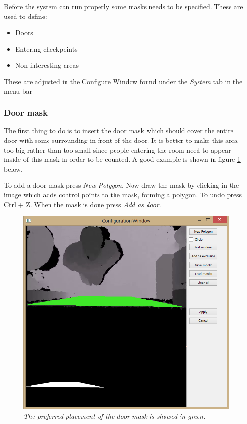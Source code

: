 Before the system can run properly some masks needs to be specified. These are used to define:

\begin{itemize}
\item Doors
\item Entering checkpoints
\item Non-interesting areas

\end{itemize}

These are adjusted in the Configure Window found under the \textit{System} tab in the menu bar.

\subsubsection{Door mask}
The first thing to do is to insert the door mask which should cover the entire door with some surrounding in front of the door. It is better to make this area too big rather than too small since people entering the room need to appear inside of this mask in order to be counted. A good example is shown in figure \ref{fig:doorMask} below. 

To add a door mask press \textit{New Polygon}. Now draw the mask by clicking in the image which adds control points to the mask, forming a polygon. To undo press Ctrl + Z. When the mask is done press \textit{Add as door}.

\begin{figure}[H]
	\centering
	\includegraphics[width=\linewidth]{images/Conf2.png}
	\caption[Door mask placement]
	{\textit{The preferred placement of the door mask is showed in green.}}
	\label{fig:doorMask}  %
\end{figure}
\newpage

